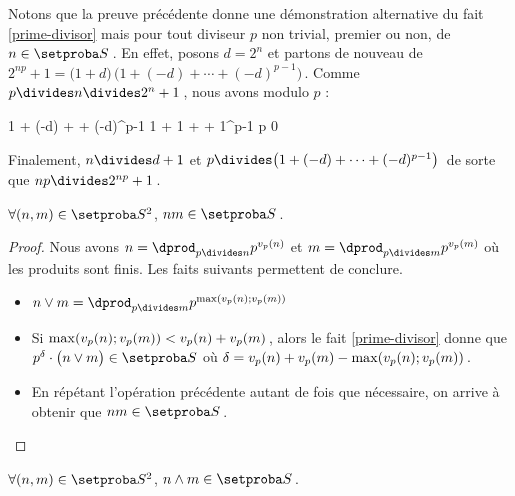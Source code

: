 Notons que la preuve précédente donne une démonstration alternative du fait \ref{prime-divisor} mais pour tout diviseur $p$ non trivial, premier ou non, de $n \in \ourset$\,.
En effet,
posons $d = 2^n$ et partons de nouveau de $2^{np} + 1 = \big( 1 + d \big) \, \big( 1 + (-d) + \cdots + (-d)^{p-1}  \big)$\,.
Comme $p \divides n \divides 2^n + 1$\,, nous avons modulo $p$ :

\medskip

\begin{stepcalc}[style = ar*, ope = \equiv]
	1 + (-d) + \cdots + (-d)^{p-1} 
	1 + 1 + \cdots + 1^{p-1} 
\explnext{}
	p
\explnext{}
	0
\end{stepcalc}

\medskip 

Finalement,
$n \divides d + 1$ et $p \divides \big( 1 + (-d) + \cdots + (-d)^{p-1}  \big)$\, de sorte que $n p \divides 2^{n p} + 1$\,.




\begin{fact} \label{product}
	$\forall (n , m) \in \ourset^2$, $n m \in \ourset$\,.
\end{fact}

\begin{proof}
	Nous avons
	$n = \dprod_{p \divides n} p^{\padicval{n}}$
	et
	$m = \dprod_{p \divides m} p^{\padicval{m}}$
	où les produits sont finis.
	Les faits suivants permettent de conclure.
%
	\begin{itemize}
		\item $n \vee m = \dprod_{p \divides m} p^{\max ( \padicval{n} ; \padicval{m} )}$

		\item Si $\max ( \padicval{n} ; \padicval{m} ) < \padicval{n} + \padicval{m}$\,, alors le fait \ref{prime-divisor} donne que $p^\delta \cdot \big( n \vee m \big) \in \ourset$ où $\delta = \padicval{n} + \padicval{m} - \max ( \padicval{n} ; \padicval{m} )$\,.

		\item En répétant l'opération précédente autant de fois que nécessaire, on arrive à obtenir que $n m \in \ourset$\,.
	\end{itemize}
\end{proof}




\begin{fact} \label{gcd}
	$\forall (n , m) \in \ourset^2$, $n \wedge m \in \ourset$\,.
\end{fact}

